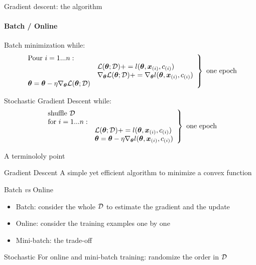 \begin{frame}{Gradient descent: the algorithm}
  \framesubtitle{Batch / Online}
  \begin{block}{Batch minimization}
    while: 
        \begin{displaymath}
          \left.
            \begin{array}{ll}
              \textrm{Pour } i = 1 ... n : \\
              &\mathcal{L}(\boldsymbol{\theta};\mathcal{D}) +=   l(\boldsymbol{\theta},\boldsymbol{x}_{(i)},{c}_{(i)}) \\
              &\nabla_{\boldsymbol{\theta}} \mathcal{L}(\boldsymbol{\theta};\mathcal{D}) += \nabla_{\boldsymbol{\theta}}   l(\boldsymbol{\theta},\boldsymbol{x}_{(i)},{c}_{(i)})   \\
              \boldsymbol{\theta} = \boldsymbol{\theta} - \eta  \nabla_{\boldsymbol{\theta}} \mathcal{L}(\boldsymbol{\theta};\mathcal{D})
            \end{array}\right\} \textrm{ one epoch}
        \end{displaymath}
  \end{block}

  \begin{block}{Stochastic Gradient Descent}
    while: 
        \begin{displaymath}
          \left.
            \begin{array}{ll}
              \textrm{shuffle } \mathcal{D}\\
              \textrm{for } i = 1 ... n : \\
              &\mathcal{L}(\boldsymbol{\theta};\mathcal{D}) +=   l(\boldsymbol{\theta},\boldsymbol{x}_{(i)},{c}_{(i)}) \\
              &\boldsymbol{\theta} = \boldsymbol{\theta} - \eta \nabla_{\boldsymbol{\theta}} l(\boldsymbol{\theta},\boldsymbol{x}_{(i)},{c}_{(i)})   \\
            \end{array}\right\} \textrm{ one epoch}
        \end{displaymath}
  \end{block}
  \begin{center}
  \end{center}
  \end{frame}

  \begin{frame}{A terminololy point}
    \begin{block}{Gradient Descent}
      A simple yet efficient algorithm to minimize a convex function
    \end{block}
    \begin{block}{Batch \textit{vs} Online}
      \begin{itemize}
      \item Batch: consider the whole $\mathcal{D}$ to estimate the gradient and the update
      \item Online: consider the training examples one by one
      \item Mini-batch: the trade-off
      \end{itemize}
    \end{block}
    \begin{block}{Stochastic}
      For online and mini-batch training: randomize the order in $\mathcal{D}$
    \end{block}
  \end{frame}